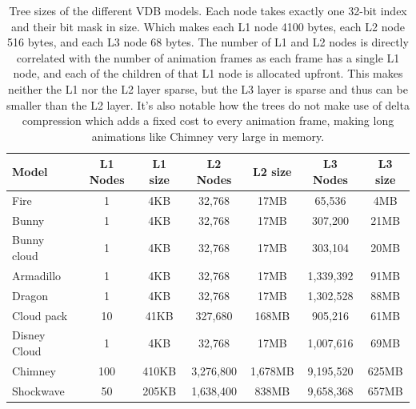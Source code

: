 \begin{table}[htbp]
    \centering
    \begin{tabularx}{\textwidth}{|X|c|c|c|c|c|c|}
        \hline
        \textbf{Model} & \textbf{L1 Nodes} & \textbf{L1 size} & \textbf{L2 Nodes} & \textbf{L2 size} & \textbf{L3 Nodes} & \textbf{L3 size} \\
        \hline
        Fire           & 1                 & 4KB              & 32,768            & 17MB             & 65,536            & 4MB              \\
        \hline
        Bunny          & 1                 & 4KB              & 32,768            & 17MB             & 307,200           & 21MB             \\
        \hline
        Bunny cloud    & 1                 & 4KB              & 32,768            & 17MB             & 303,104           & 20MB             \\
        \hline
        Armadillo      & 1                 & 4KB              & 32,768            & 17MB             & 1,339,392         & 91MB             \\
        \hline
        Dragon         & 1                 & 4KB              & 32,768            & 17MB             & 1,302,528         & 88MB             \\
        \hline
        Cloud pack     & 10                & 41KB             & 327,680           & 168MB            & 905,216           & 61MB             \\
        \hline
        Disney Cloud   & 1                 & 4KB              & 32,768            & 17MB             & 1,007,616         & 69MB             \\
        \hline
        Chimney        & 100               & 410KB            & 3,276,800         & 1,678MB          & 9,195,520         & 625MB            \\
        \hline
        Shockwave      & 50                & 205KB            & 1,638,400         & 838MB            & 9,658,368         & 657MB            \\
        \hline
    \end{tabularx}
    \caption{Tree sizes of the different VDB models. Each node takes exactly one 32-bit index and their bit mask in size. Which makes each L1 node 4100 bytes, each L2 node 516 bytes, and each L3 node 68 bytes. The number of L1 and L2 nodes is directly correlated with the number of animation frames as each frame has a single L1 node, and each of the children of that L1 node is allocated upfront. This makes neither the L1 nor the L2 layer sparse, but the L3 layer is sparse and thus can be smaller than the L2 layer. It's also notable how the trees do not make use of delta compression which adds a fixed cost to every animation frame, making long animations like Chimney very large in memory.}
    \label{tab:tree_sizes}
\end{table}

